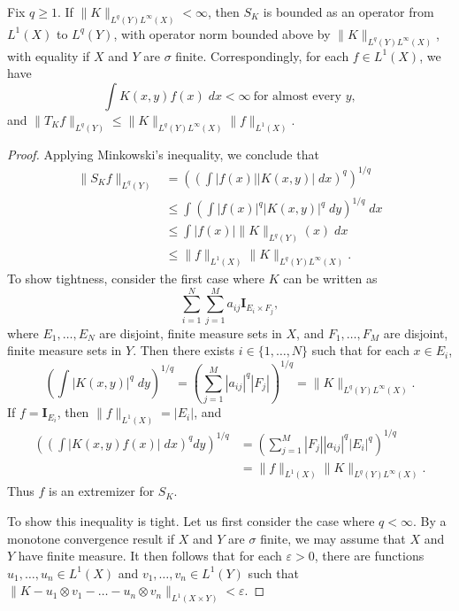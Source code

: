 \begin{theorem}
  Fix $q \geq 1$. If $\| K \|_{L^q(Y) L^\infty(X)} < \infty$, then $S_K$ is bounded as an operator from $L^1(X)$ to $L^q(Y)$, with operator norm bounded above by $\| K \|_{L^q(Y) L^\infty(X)}$, with equality if $X$ and $Y$ are $\sigma$ finite. Correspondingly, for each $f \in L^1(X)$, we have
  \[ \int K(x,y) f(x)\; dx < \infty\ \text{for almost every $y$}, \]
  and $\| T_K f \|_{L^q(Y)} \leq \| K \|_{L^q(Y) L^\infty(X)} \| f \|_{L^1(X)}$.
\end{theorem}
\begin{proof}
  Applying Minkowski's inequality, we conclude that
  \begin{align*}
    \| S_K f \|_{L^q(Y)} &= \left( \left( \int |f(x)| |K(x,y)|\; dx \right)^q \right)^{1/q}\\
    &\leq \int \left( \int |f(x)|^q |K(x,y)|^q\; dy \right)^{1/q}\; dx\\
    &\leq \int |f(x)| \| K \|_{L^q(Y)}(x)\; dx\\
    &\leq \| f \|_{L^1(X)} \| K \|_{L^q(Y) L^\infty(X)}.
  \end{align*}
  To show tightness, consider the first case where $K$ can be written as
  \[ \sum_{i = 1}^N \sum_{j = 1}^M a_{ij} \mathbf{I}_{E_i \times F_j}, \]
  where $E_1, \dots, E_N$ are disjoint, finite measure sets in $X$, and $F_1, \dots, F_M$ are disjoint, finite measure sets in $Y$. Then there exists $i \in \{ 1, \dots, N \}$ such that for each $x \in E_i$,
  \[ \left( \int |K(x,y)|^q\; dy \right)^{1/q} = \left( \sum_{j = 1}^M |a_{ij}|^q |F_j| \right)^{1/q} = \| K \|_{L^q(Y) L^\infty(X)}. \]
  If $f = \mathbf{I}_{E_i}$, then $\| f \|_{L^1(X)} = |E_i|$, and
  \begin{align*}
    \left( \left( \int |K(x,y) f(x)|\; dx \right)^q dy \right)^{1/q} &= \left( \sum_{j = 1}^M |F_j| |a_{ij}|^q |E_i|^q \right)^{1/q}\\
    &= \| f \|_{L^1(X)} \| K \|_{L^q(Y) L^\infty(X)}.
  \end{align*}
  Thus $f$ is an extremizer for $S_K$.

  To show this inequality is tight. Let us first consider the case where $q < \infty$. By a monotone convergence result if $X$ and $Y$ are $\sigma$ finite, we may assume that $X$ and $Y$ have finite measure. It then follows that for each $\varepsilon > 0$, there are functions $u_1, \dots, u_n \in L^1(X)$ and $v_1, \dots, v_n \in L^1(Y)$ such that $\| K - u_1 \otimes v_1 - \dots - u_n \otimes v_n \|_{L^1(X \times Y)} < \varepsilon$.
\end{proof}

